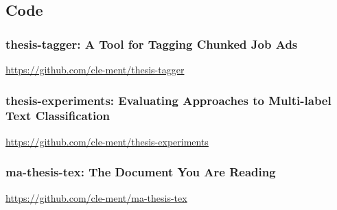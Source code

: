 \clearpage

\subsection{Code}

\subsubsection*{thesis-tagger: A Tool for Tagging Chunked Job Ads}
\label{sub:thesis-tagger: A Tool for Tagging Chunked Job Ads}

\url{https://github.com/cle-ment/thesis-tagger}

\subsubsection*{thesis-experiments: Evaluating Approaches to Multi-label Text Classification}
\label{sub:thesis-experiments: Evaluating Approaches to Multi-label Text Classification}


\url{https://github.com/cle-ment/thesis-experiments}

\subsubsection*{ma-thesis-tex: The Document You Are Reading}
\label{sub:ma-thesis-tex: The Document You Are Reading}

\url{https://github.com/cle-ment/ma-thesis-tex}

